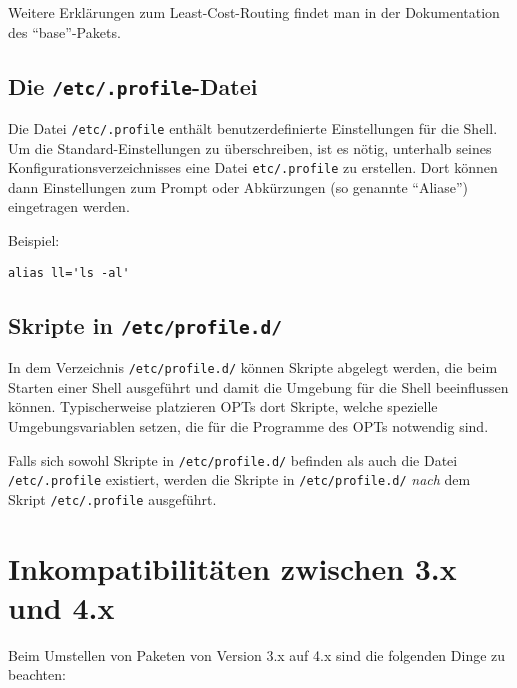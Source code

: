 Weitere Erklärungen zum Least-Cost-Routing findet man in der Dokumentation des "`base"'-Pakets.

\subsection{Die \texttt{/etc/.profile}-Datei}

Die Datei \texttt{/etc/.profile} enthält benutzerdefinierte Einstellungen für
die Shell. Um die Stan\-dard-Einstellungen zu überschreiben, ist es nötig,
unterhalb seines Konfigurationsverzeichnisses eine Datei \texttt{etc/.profile}
zu erstellen. Dort können dann Einstellungen zum Prompt oder Abkürzungen
(so genannte "`Aliase"') eingetragen werden.


Beispiel:

\begin{example}
\begin{verbatim}
alias ll='ls -al'
\end{verbatim}
\end{example}

\subsection{Skripte in \texttt{/etc/profile.d/}}

In dem Verzeichnis \texttt{/etc/profile.d/} können Skripte abgelegt werden, die
beim Starten einer Shell ausgeführt und damit die Umgebung für die Shell
beeinflussen können. Typischerweise platzieren OPTs dort Skripte, welche
spezielle Umgebungsvariablen setzen, die für die Programme des OPTs notwendig
sind.

Falls sich sowohl Skripte in \texttt{/etc/profile.d/} befinden als auch die
Datei \texttt{/etc/.profile} existiert, werden die Skripte in
\texttt{/etc/profile.d/} \emph{nach} dem Skript \texttt{/etc/.profile}
ausgeführt.

\section{Inkompatibilitäten zwischen 3.x und 4.x}

Beim Umstellen von Paketen von Version 3.x auf 4.x sind die folgenden Dinge
zu beachten:

